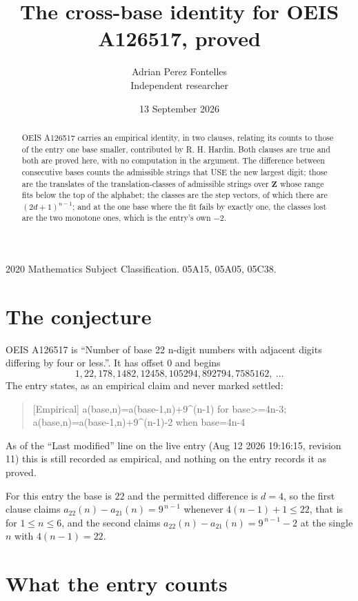 \documentclass[11pt,a4paper]{article}
\title{The cross-base identity for OEIS A126517, proved}
\author{Adrian Perez Fontelles\\ \small Independent researcher}
\date{13 September 2026}
\theoremstyle{plain}
\theoremstyle{definition}
\begin{document}
\maketitle

\begin{abstract}
OEIS A126517 carries an empirical identity, in two clauses, relating its counts to those of the
entry one base smaller, contributed by R. H. Hardin. Both clauses are true and both are proved
here, with no computation in the argument. The difference between consecutive bases counts the
admissible strings that USE the new largest digit; those are the translates of the
translation-classes of admissible strings over $\mathbf{Z}$ whose range fits below the top of
the alphabet; the classes are the step vectors, of which there are $(2d+1)^{n-1}$; and at the
one base where the fit fails by exactly one, the classes lost are the two monotone ones, which
is the entry's own $-2$.
\end{abstract}

\noindent\small 2020 Mathematics Subject Classification. 05A15, 05A05, 05C38.\normalsize

\section{The conjecture}

OEIS A126517 is ``Number of base 22 n-digit numbers with adjacent digits differing by four or less.''. It has offset $0$ and begins
\[
1, 22, 178, 1482, 12458, 105294, 892794, 7585162,\ \dots
\]
The entry states, as an empirical claim and never marked settled:
\begin{quote}
[Empirical] a(base,n)=a(base-1,n)+9\textasciicircum{}(n-1) for base>=4n-3; a(base,n)=a(base-1,n)+9\textasciicircum{}(n-1)-2 when base=4n-4
\end{quote}
As of the ``Last modified'' line on the live entry (Aug 12 2026 19:16:15, revision 11)
this is still recorded as empirical, and nothing on the entry records it as proved.

For this entry the base is $22$ and the permitted difference is $d=4$, so the first clause
claims $a_{22}(n)-a_{21}(n)=9^{\,n-1}$ whenever $4(n-1)+1\le22$, that is for
$1\le n\le6$, and the second claims $a_{22}(n)-a_{21}(n)=9^{\,n-1}-2$ at the single
$n$ with $4(n-1)=22$.

\section{What the entry counts}
\end{document}
